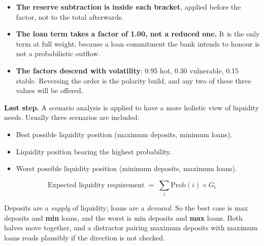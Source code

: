 \begin{lrtrapbox}
\begin{itemize}
\item \textbf{The reserve subtraction is inside each bracket}, applied before the factor, not to the total afterwards.
\item \textbf{The loan term takes a factor of 1.00, not a reduced one.} It is the only term at full weight, because a loan commitment the bank intends to honour is not a probabilistic outflow.
\item \textbf{The factors descend with volatility}: 0.95 hot, 0.30 vulnerable, 0.15 stable. Reversing the order is the polarity build, and any two of these three values will be offered.
\end{itemize}
\end{lrtrapbox}

\textbf{Last step.} A scenario analysis is applied to have a more holistic view of liquidity needs. Usually three scenarios are included:

\begin{itemize}
\item Best possible liquidity position (maximum deposits, minimum loans).
\item Liquidity position bearing the highest probability.
\item Worst possible liquidity position (minimum deposits, maximum loans).
\end{itemize}

\begin{lrfmlbox}
\[ \text{Expected liquidity requirement} \;=\; \sum_i \text{Prob}(i) \times G_i \]
\end{lrfmlbox}

\begin{lrtrapbox}
Deposits are a \emph{supply} of liquidity; loans are a \emph{demand}. So the best case is max deposits and \textbf{min} loans, and the worst is min deposits and \textbf{max} loans. Both halves move together, and a distractor pairing maximum deposits with maximum loans reads plausibly if the direction is not checked.
\end{lrtrapbox}

